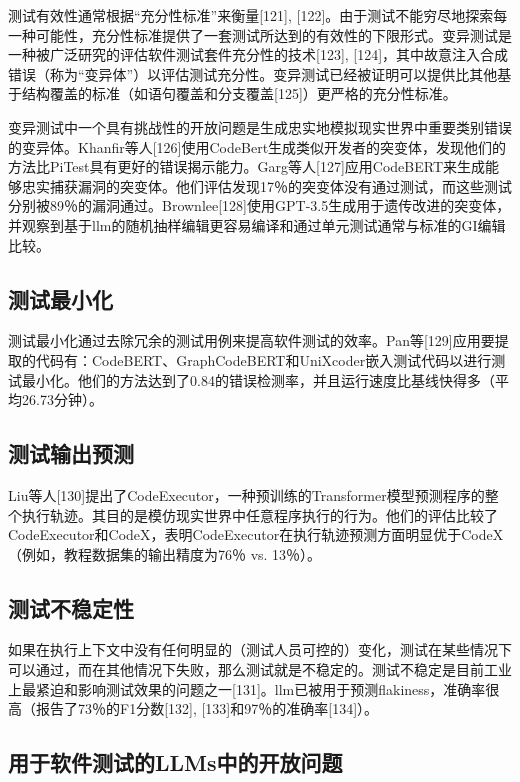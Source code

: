 \begin{translation}
测试有效性通常根据“充分性标准”来衡量[121], [122]。由于测试不能穷尽地探索每一种可能性，充分性标准提供了一套测试所达到的有效性的下限形式。变异测试是一种被广泛研究的评估软件测试套件充分性的技术[123], [124]，其中故意注入合成错误（称为“变异体”）以评估测试充分性。变异测试已经被证明可以提供比其他基于结构覆盖的标准（如语句覆盖和分支覆盖[125]）更严格的充分性标准。

变异测试中一个具有挑战性的开放问题是生成忠实地模拟现实世界中重要类别错误的变异体。Khanfir等人[126]使用CodeBert生成类似开发者的突变体，发现他们的方法比PiTest具有更好的错误揭示能力。Garg等人[127]应用CodeBERT来生成能够忠实捕获漏洞的突变体。他们评估发现17％的突变体没有通过测试，而这些测试分别被89％的漏洞通过。Brownlee[128]使用GPT-3.5生成用于遗传改进的突变体，并观察到基于llm的随机抽样编辑更容易编译和通过单元测试通常与标准的GI编辑比较。

\subsection{测试最小化}

测试最小化通过去除冗余的测试用例来提高软件测试的效率。Pan等[129]应用要提取的代码有：CodeBERT、GraphCodeBERT和UniXcoder嵌入测试代码以进行测试最小化。他们的方法达到了0.84的错误检测率，并且运行速度比基线快得多（平均26.73分钟）。

\subsection{测试输出预测}

Liu等人[130]提出了CodeExecutor，一种预训练的Transformer模型预测程序的整个执行轨迹。其目的是模仿现实世界中任意程序执行的行为。他们的评估比较了CodeExecutor和CodeX，表明CodeExecutor在执行轨迹预测方面明显优于CodeX（例如，教程数据集的输出精度为76％ vs. 13％）。

\subsection{测试不稳定性}

如果在执行上下文中没有任何明显的（测试人员可控的）变化，测试在某些情况下可以通过，而在其他情况下失败，那么测试就是不稳定的。测试不稳定是目前工业上最紧迫和影响测试效果的问题之一[131]。llm已被用于预测flakiness，准确率很高（报告了73％的F1分数[132], [133]和97％的准确率[134]）。

\subsection{用于软件测试的LLMs中的开放问题}


\end{translation}
